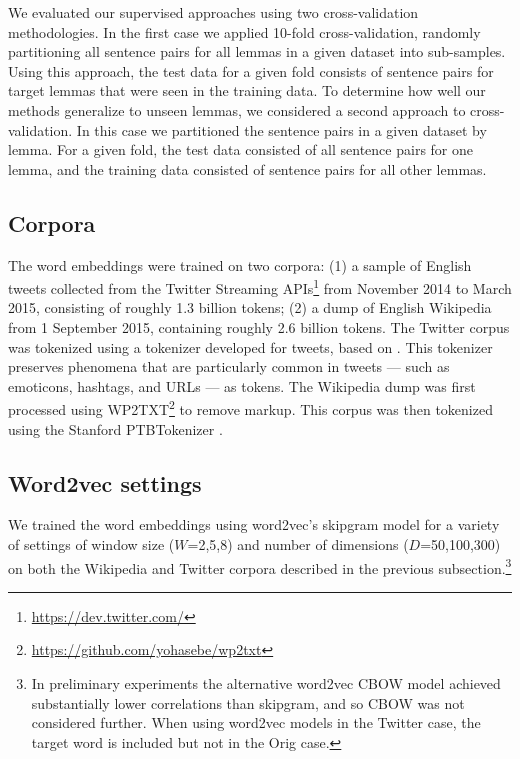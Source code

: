 \documentclass[11pt]{article}
\begin{document}


We evaluated our supervised approaches using two cross-validation
methodologies. In the first case we applied 10-fold cross-validation,
randomly partitioning all sentence pairs for all lemmas in a given
dataset into sub-samples. Using this approach, the test data for a
given fold consists of sentence pairs for target lemmas that were seen
in the training data. To determine how well our methods generalize to
unseen lemmas, we considered a second approach to cross-validation. In
this case we partitioned the sentence pairs in a given dataset by
lemma. For a given fold, the test data consisted of all sentence pairs
for one lemma, and the training data consisted of sentence pairs for
all other lemmas.

\subsection{Corpora\label{sec:corpora}}


The word embeddings were trained on two corpora: (1) a sample of
English tweets collected from the Twitter Streaming
APIs\footnote{\url{https://dev.twitter.com/}} from November 2014 to
March 2015, consisting of roughly 1.3 billion tokens; (2) a dump of
English Wikipedia from 1 September 2015, containing roughly 2.6
billion tokens. The Twitter corpus was tokenized using a tokenizer
developed for tweets, based on \cite{OConnor+:2010}. This tokenizer
preserves phenomena that are particularly common in tweets --- such as
emoticons, hashtags, and URLs --- as tokens. The Wikipedia dump was
first processed using
WP2TXT\footnote{\url{https://github.com/yohasebe/wp2txt}} to remove
markup. This corpus was then tokenized using the Stanford PTBTokenizer
\citep{manning-EtAl:2014:P14-5}.


\subsection{Word2vec settings\label{sec:w2vparams}}
We trained the word embeddings using word2vec's skipgram model for a
variety of settings of window size ($W$=2,5,8) and number of
dimensions ($D$=50,100,300) on both the Wikipedia and Twitter corpora
described in the previous subsection.\footnote{In preliminary
  experiments the alternative word2vec CBOW model achieved
  substantially lower correlations than skipgram, and so CBOW was not
  considered further. When using word2vec models in the Twitter case, the target word is included but not in the Orig case.}
\end{document}

